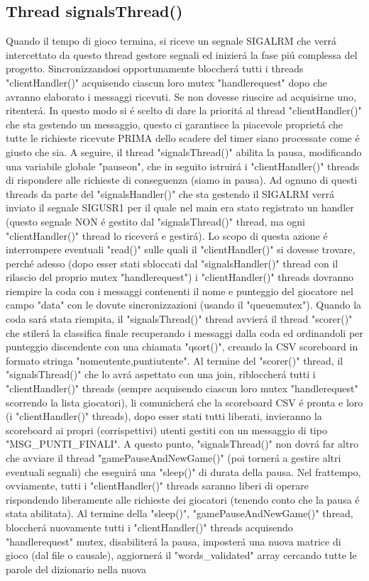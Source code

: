  \subsection{Thread signalsThread()}

Quando il tempo di gioco termina, si riceve un segnale SIGALRM che verr\'a intercettato da questo thread gestore segnali ed inizier\'a la fase pi\'u complessa del progetto. Sincronizzandosi opportunamente bloccher\'a tutti i threads "clientHandler()" acquisendo ciascun loro mutex "handlerequest" dopo che avranno elaborato i messaggi ricevuti. Se non dovesse riuscire ad acquisirne uno, ritenter\'a. In questo modo si \'e scelto di dare la priorit\'a al thread "clientHandler()" che sta gestendo un messaggio, questo ci garantisce la piacevole propriet\'a che tutte le richieste ricevute PRIMA dello scadere del timer siano processate come \'e giusto che sia. A seguire, il thread "signalsThread()" abilita la pausa, modificando una variabile globale "pauseon", che in seguito istruir\'a i "clientHandler()" threads di rispondere alle richieste di conseguenza (siamo in pausa). Ad ognuno di questi threads da parte del "signalsHandler()" che sta gestendo il SIGALRM verr\'a inviato il segnale SIGUSR1 per il quale nel main era stato registrato un handler (questo segnale NON \'e gestito dal "signalsThread()" thread, ma ogni "clientHandler()" thread lo ricever\'a e gestir\'a). Lo scopo di questa azione \'e interrompere eventuali "read()" sulle quali il "clientHandler()" si dovesse trovare, perch\'e adesso (dopo esser stati sbloccati dal "signalsHandler()" thread con il rilascio del proprio mutex "handlerequest") i "clientHandler()" threads dovranno riempire la coda con i messaggi contenenti il nome e punteggio del giocatore nel campo "data" con le dovute sincronizzazioni (usando il "queuemutex"). Quando la coda sar\'a stata riempita, il "signalsThread()" thread avvier\'a il thread "scorer()" che stiler\'a la classifica finale recuperando i messaggi dalla coda ed ordinandoli per punteggio discendente con una chiamata "qsort()", creando la CSV scoreboard in formato stringa "nomeutente,puntiutente". Al termine del "scorer()" thread, il "signalsThread()" che lo avr\'a aspettato con una join, ribloccher\'a tutti i "clientHandler()" threads (sempre acquisendo ciascun loro mutex "handlerequest" scorrendo la lista giocatori), li comunicher\'a che la scoreboard CSV \'e pronta e loro (i "clientHandler()" threads), dopo esser stati tutti liberati, invieranno la scoreboard ai propri (corrispettivi) utenti gestiti con un messaggio di tipo "MSG\_PUNTI\_FINALI". A questo punto, "signalsThread()" non dovr\'a far altro che avviare il thread "gamePauseAndNewGame()" (poi torner\'a a gestire altri eventuali segnali) che eseguir\'a una "sleep()" di durata della pausa. Nel frattempo, ovviamente, tutti i "clientHandler()" threads saranno liberi di operare rispondendo liberamente alle richieste dei giocatori (tenendo conto che la pausa \'e stata abilitata). Al termine della "sleep()", "gamePauseAndNewGame()" thread, bloccher\'a nuovamente tutti i "clientHandler()" threads acquisendo "handlerequest" mutex, disabiliter\'a la pausa, imposter\'a una nuova matrice di gioco (dal file o causale), aggiorner\'a il "words\_validated" array cercando tutte le parole del dizionario nella nuova 